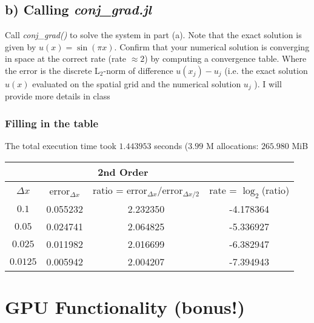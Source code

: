\documentclass{article}
\begin{document}
\subsection{b) Calling \textit{conj\_grad.jl}}

 Call \textit{conj\_grad()} to solve the system in part (a). Note that the exact
 solution is given by $u(x) = \sin(\pi x)$.  Confirm that your numerical
 solution is converging in space at the correct rate (rate $\approx 2$) by
 computing a convergence table.  Where the error is the discrete L$_2$-norm of
 difference $u(x_j) - u_j$ (i.e. the exact solution $u(x)$ evaluated on the spatial
 grid and the numerical solution $u_j$ ). I will provide more details in class

\subsubsection{Filling in the table}
The total execution time took $1.443953$ seconds ($3.99$ M allocations:
$265.980$ MiB

\begin{table}[h]
  \begin{center}
    \begin{tabular}{cccc}
      \toprule
      \multicolumn{1}{c}{} &  \multicolumn{2}{c}{2nd Order}  \\
      \midrule
      $\Delta x$&  \hspace{3mm} error$_{\Delta x}$ &\hspace{3mm} ratio = error$_{\Delta x}$/error$_{\Delta x/2}$ \hspace{3mm} &\hspace{3mm} rate = $\log_{2}$(ratio)   \\
      $0.1$    & 0.055232 & 2.232350 & -4.178364 \\
      $0.05 $  & 0.024741 & 2.064825 & -5.336927 \\
      $0.025$  & 0.011982 & 2.016699 & -6.382947 \\
      $0.0125$ & 0.005942 & 2.004207 & -7.394943 \\
      \bottomrule
    \end{tabular}
  \end{center}
\end{table}

\section{GPU Functionality (bonus!)}
\end{document}
